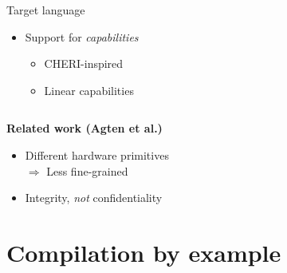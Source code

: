 \documentclass{beamer}
\begin{document}
\begin{frame}
\begin{columns}
\begin{column}{0.45\textwidth}
\begin{block}{Target language}
\begin{itemize}
	\item Support for \emph{capabilities}\\
		\begin{itemize}
		\item CHERI-inspired 
		\item Linear capabilities
		\end{itemize}
	\end{itemize}
	\end{block}
\end{column}
\end{columns}
\vspace{1em}
\centering
\textbf{Related work (Agten et al.)} %
\begin{itemize}
\item \centering
Different hardware primitives\\%
	$\Rightarrow$ Less fine-grained
\item \centering
Integrity, \emph{not} confidentiality
\end{itemize}
\end{frame}

\section{Compilation by example}

\end{document}
